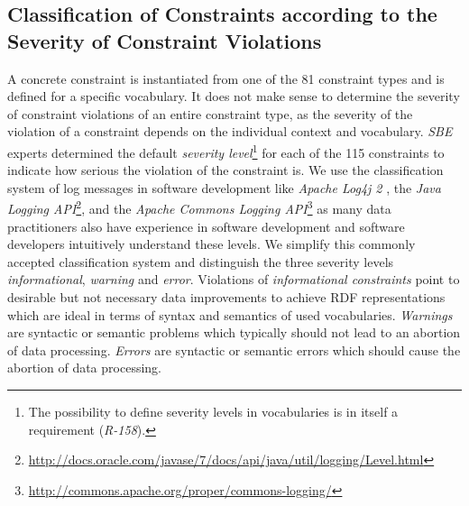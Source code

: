 \documentclass[conference]{IEEEtran}
\newcommand{\ke}[1]{\todo[size=\small, color=red!40]{\textbf{Kai:} #1}}
\begin{document}
\subsection{Classification of Constraints according to the Severity of Constraint Violations}

A concrete constraint is instantiated from one of the 81 constraint types and is defined for a specific vocabulary.
It does not make sense to determine the severity of constraint violations of an entire constraint type,
as the severity of the violation of a constraint depends on the individual context and vocabulary.
\emph{SBE} experts determined the default \emph{severity level}\footnote{The possibility to define severity levels in vocabularies is in itself a requirement (\emph{R-158}).} for each of the 115 constraints to indicate how serious the violation of the constraint is. We use the classification system of log messages in software development like \emph{Apache Log4j 2} \cite{Apache-2015}, the \emph{Java Logging API}\footnote{\url{http://docs.oracle.com/javase/7/docs/api/java/util/logging/Level.html}}, and the \emph{Apache Commons Logging API}\footnote{\url{http://commons.apache.org/proper/commons-logging/}} as many data practitioners also have experience in software development and software developers intuitively understand these levels. We simplify this commonly accepted classification system and distinguish the three severity levels \emph{informational}, \emph{warning} and \emph{error}.
Violations of \emph{informational constraints} point to desirable but not necessary data improvements to achieve RDF representations which are ideal in terms of syntax and semantics of used vocabularies. 
\emph{Warnings} are syntactic or semantic problems which typically should not lead to an abortion of data processing.
\emph{Errors} are syntactic or semantic errors which should cause the abortion of data processing. 
\end{document}
